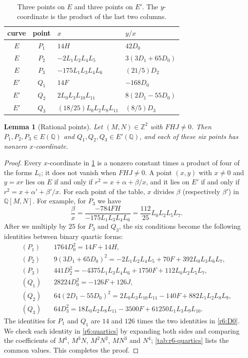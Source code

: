 \documentclass[12pt,oneside,openany]{book}
\theoremstyle{definition}
\theoremstyle{plain}
\numberwithin{equation}{chapter}
\theoremstyle{plain}
\newtheorem{lemma}[lemma]{Lemma}
\theoremstyle{definition}
\theoremstyle{remark}
\newcommand{\Q}{\mathbb Q}
\newcommand{\Z}{\mathbb Z}
\begin{document}
\begin{table}[htbp]
\centering
\caption{Three points on $E$ and three points on $E'$. The $y$-coordinate is the product of the last two columns.}
\label{tab:r6-points}
\begin{tabular}{ccll}
\toprule
curve & point & $x$ & $y/x$\\
\midrule
$E$ & $P_1$ & $14H$ & $42D_0$\\
$E$ & $P_2$ & $-2L_1L_2L_4L_5$ & $3(3D_1+65D_0)$\\
$E$ & $P_3$ & $-175L_1L_3L_4L_6$ & $(21/5)D_2$\\
$E'$ & $Q_1$ & $14F$ & $-168D_0$\\
$E'$ & $Q_2$ & $2L_0L_3L_{10}L_{11}$ & $8(2D_1-55D_0)$\\
$E'$ & $Q_3$ & $(18/25)L_0L_2L_8L_{11}$ & $(8/5)D_3$\\
\bottomrule
\end{tabular}
\end{table}

\begin{lemma}[Rational points]\label{lem:r6-points}
Let $(M,N)\in\Z^2$ with $FHJ\ne0$. Then $P_1,P_2,P_3\in E(\Q)$ and $Q_1,Q_2,Q_3\in E'(\Q)$, and each of these six points has nonzero $x$-coordinate.
\end{lemma}

\begin{proof}
Every $x$-coordinate in \cref{tab:r6-points} is a nonzero constant times a product of four of the forms $L_i$; it does not vanish when $FHJ\ne0$. A point $(x,y)$ with $x\ne0$ and $y=xr$ lies on $E$ if and only if $r^2=x+\alpha+\beta/x$, and it lies on $E'$ if and only if $r^2=x+\alpha'+\beta'/x$. For each point of the table, $x$ divides $\beta$ (respectively $\beta'$) in $\Q[M,N]$. For example, for $P_3$ we have
\[
\frac{\beta}{x}=\frac{-784FH}{-175L_1L_3L_4L_6}=\frac{112}{25}L_0L_2L_5L_7.
\]
After we multiply by $25$ for $P_3$ and $Q_3$, the six conditions become the following identities between binary quartic forms:
\begin{equation}\label{r6:quartics}
\begin{aligned}
(P_1)&\quad 1764D_0^2=14F+14H,\\
(P_2)&\quad 9(3D_1+65D_0)^2=-2L_1L_2L_4L_5+70F+392L_0L_3L_6L_7,\\
(P_3)&\quad 441D_2^2=-4375L_1L_3L_4L_6+1750F+112L_0L_2L_5L_7,\\
(Q_1)&\quad 28224D_0^2=-126F+126J,\\
(Q_2)&\quad 64(2D_1-55D_0)^2=2L_0L_3L_{10}L_{11}-140F+882L_1L_2L_8L_9,\\
(Q_3)&\quad 64D_3^2=18L_0L_2L_8L_{11}-3500F+61250L_1L_3L_9L_{10}.
\end{aligned}
\end{equation}
The identities for $P_1$ and $Q_1$ are $14$ and $126$ times the two identities in \eqref{r6:D0}. We check each identity in \eqref{r6:quartics} by expanding both sides and comparing the coefficients of $M^4$, $M^3N$, $M^2N^2$, $MN^3$ and $N^4$; \cref{tab:r6-quartics} lists the common values. This completes the proof.
\end{proof}
\end{document}

